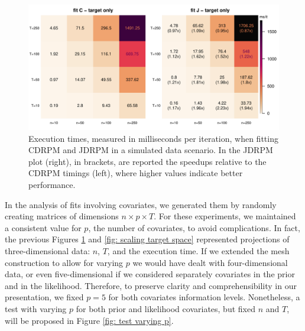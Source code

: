 \documentclass[12pt,	%
	a4paper,		%
	twoside,		%
	openright,		%
	titlepage,%
	]{book}
\theoremstyle{definition}
\begin{document}
\begin{figure}[!ht]
    \centering
    \includegraphics[width=1\linewidth]{Testing/Scaling possibilities/target.pdf}
    \caption[Execution times of CDRPM and JDRPM, simulated data scenario]{Execution times, measured in milliseconds per iteration, when fitting CDRPM and JDRPM in a simulated data scenario. In the JDRPM plot (right), in brackets, are reported the speedups relative to the CDRPM timings (left), where higher values indicate better performance.}
    \label{fig: scaling target}
\end{figure}


In the analysis of fits involving covariates, we generated them by randomly creating matrices of dimensions $n\times p \times T$. For these experiments, we maintained a consistent value for $p$, the number of covariates, to avoid complications. In fact, the previous Figures \ref{fig: scaling target} and \ref{fig: scaling target space} represented projections of three-dimensional data: $n$, $T$, and the execution time. If we extended the mesh construction to allow for varying $p$ we would have dealt with four-dimensional data, or even five-dimensional if we considered separately covariates in the prior and in the likelihood. Therefore, to preserve clarity and comprehensibility in our presentation, we fixed $p=5$ for both covariates information levels. Nonetheless, a test with varying $p$ for both prior and likelihood covariates, but fixed $n$ and $T$, will be proposed in Figure \ref{fig: test varying p}.
\end{document}
